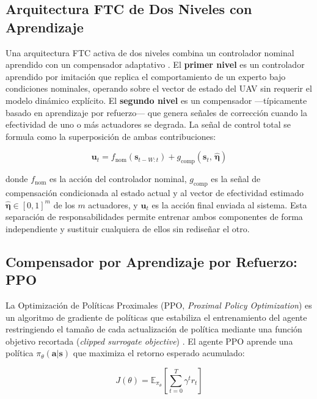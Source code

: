 \subsection{Arquitectura FTC de Dos Niveles con Aprendizaje}

Una arquitectura FTC activa de dos niveles combina un controlador nominal aprendido con un compensador adaptativo \cite{freddi2019, du2023}. El \textbf{primer nivel} es un controlador aprendido por imitación que replica el comportamiento de un experto bajo condiciones nominales, operando sobre el vector de estado del UAV sin requerir el modelo dinámico explícito. El \textbf{segundo nivel} es un compensador —típicamente basado en aprendizaje por refuerzo— que genera señales de corrección cuando la efectividad de uno o más actuadores se degrada. La señal de control total se formula como la superposición de ambas contribuciones:

\begin{equation}
\mathbf{u}_t = f_{\text{nom}}(\mathbf{s}_{t-W:t}) + g_{\text{comp}}(\mathbf{s}_t,\, \hat{\boldsymbol{\eta}})
\end{equation}

\noindent donde $f_{\text{nom}}$ es la acción del controlador nominal, $g_{\text{comp}}$ es la señal de compensación condicionada al estado actual y al vector de efectividad estimado $\hat{\boldsymbol{\eta}} \in [0,1]^m$ de los $m$ actuadores, y $\mathbf{u}_t$ es la acción final enviada al sistema. Esta separación de responsabilidades permite entrenar ambos componentes de forma independiente y sustituir cualquiera de ellos sin rediseñar el otro.

\subsection{Compensador por Aprendizaje por Refuerzo: PPO}

La Optimización de Políticas Proximales (PPO, \textit{Proximal Policy Optimization}) es un algoritmo de gradiente de políticas que estabiliza el entrenamiento del agente restringiendo el tamaño de cada actualización de política mediante una función objetivo recortada (\textit{clipped surrogate objective}) \cite{fei2020, liu2024}. El agente PPO aprende una política $\pi_\theta(\mathbf{a}|\mathbf{s})$ que maximiza el retorno esperado acumulado:

\begin{equation}
J(\theta) = \mathbb{E}_{\pi_\theta}\!\left[\sum_{t=0}^{T} \gamma^t r_t\right]
\end{equation}

